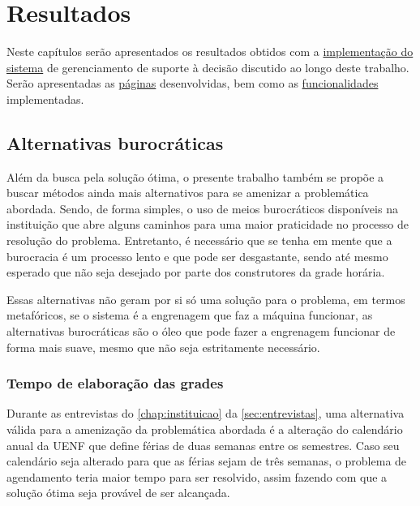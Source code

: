 \chapter{Resultados} \label{chap:resultados} %

Neste capítulos serão apresentados os resultados obtidos com a \hyperref[sec:sistema]{implementação do sistema} de gerenciamento de suporte à decisão discutido ao longo deste trabalho. Serão apresentadas as \hyperref[ssec:paginas]{páginas} desenvolvidas, bem como as \hyperref[ssec:funcionalidades]{funcionalidades} implementadas.

\section{Alternativas burocráticas} %

Além da busca pela solução ótima, o presente trabalho também se propõe a buscar métodos ainda mais alternativos para se amenizar a problemática abordada. Sendo, de forma simples, o uso de meios burocráticos disponíveis na instituição que abre alguns caminhos para uma maior praticidade no processo de resolução do problema. Entretanto, é necessário que se tenha em mente que a burocracia é um processo lento e que pode ser desgastante, sendo até mesmo esperado que não seja desejado por parte dos construtores da grade horária.

Essas alternativas não geram por si só uma solução para o problema, em termos metafóricos, se o sistema é a engrenagem que faz a máquina funcionar, as alternativas burocráticas são o óleo que pode fazer a engrenagem funcionar de forma mais suave, mesmo que não seja estritamente necessário.

\subsection{Tempo de elaboração das grades} \label{ssec:burocracia-férias} %

Durante as entrevistas do \autoref{chap:instituicao} da \autoref{sec:entrevistas}, uma alternativa válida para a amenização da problemática abordada é a alteração do calendário anual da UENF que define férias de duas semanas entre os semestres. Caso seu calendário seja alterado para que as férias sejam de três semanas, o problema de agendamento teria maior tempo para ser resolvido, assim fazendo com que a solução ótima seja provável de ser alcançada.


